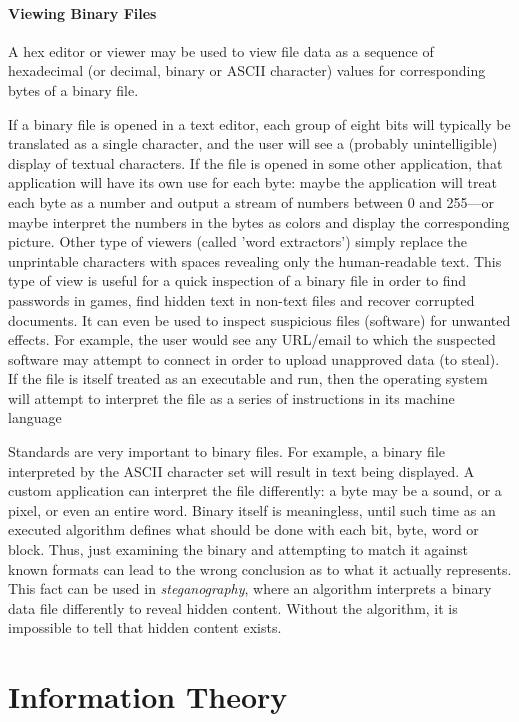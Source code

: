 \documentclass[a4paper, 12pt]{report}
\theoremstyle{remark}
\theoremstyle{definition}
\begin{document}
\subsubsection{Viewing Binary Files}
A hex editor or viewer may be used to view file data as a sequence of hexadecimal (or decimal, binary or ASCII character) values for corresponding bytes of a binary file. 

If a binary file is opened in a text editor, each group of eight bits will typically be translated as a single character, and the user will see a (probably unintelligible) display of textual characters. If the file is opened in some other application, that application will have its own use for each byte: maybe the application will treat each byte as a number and output a stream of numbers between 0 and 255—or maybe interpret the numbers in the bytes as colors and display the corresponding picture. Other type of viewers (called 'word extractors') simply replace the unprintable characters with spaces revealing only the human-readable text. This type of view is useful for a quick inspection of a binary file in order to find passwords in games, find hidden text in non-text files and recover corrupted documents. It can even be used to inspect suspicious files (software) for unwanted effects. For example, the user would see any URL/email to which the suspected software may attempt to connect in order to upload unapproved data (to steal). If the file is itself treated as an executable and run, then the operating system will attempt to interpret the file as a series of instructions in its machine language

Standards are very important to binary files. For example, a binary file interpreted by the ASCII character set will result in text being displayed. A custom application can interpret the file differently: a byte may be a sound, or a pixel, or even an entire word. Binary itself is meaningless, until such time as an executed algorithm defines what should be done with each bit, byte, word or block. Thus, just examining the binary and attempting to match it against known formats can lead to the wrong conclusion as to what it actually represents. This fact can be used in \textit{steganography}, where an algorithm interprets a binary data file differently to reveal hidden content. Without the algorithm, it is impossible to tell that hidden content exists.

\chapter{Information Theory}
\end{document}
